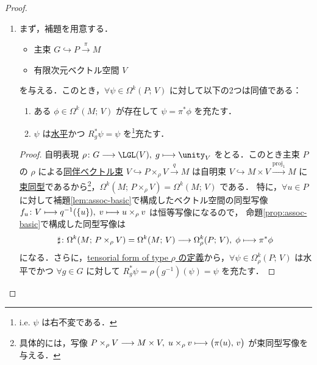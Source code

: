 \documentclass[TQFT_main]{subfiles}
\begin{document}
\begin{proof}
    \begin{enumerate}
        \item まず，補題を用意する．
        
        \hrulefill
        \begin{mylem}[label=lem:basic-form]{}
            \begin{itemize}
                \item 主束 $G \hookrightarrow P \xrightarrow{\pi} M$
                \item 有限次元ベクトル空間 $V$
            \end{itemize}
            を与える．このとき，$\forall \psi \in \Omega^k(P;\, V)$ に対して以下の2つは同値である：
            \begin{enumerate}
                \item ある $\phi \in \Omega^k (M;\, V)$ が存在して $\psi = \pi^* \phi$ を充たす．
                \item $\psi$ は\hyperref[def:tensorial-form]{水平}かつ $R_g^* \psi = \psi$ を\footnote{i.e. $\psi$ は右不変である．}充たす．
            \end{enumerate}
        \end{mylem}
        \begin{proof}
            自明表現 $\rho \colon G \lto \LGL(V),\; g \lmto \unity_V$ をとる．このとき主束 $P$ の $\rho$ による\hyperref[def:associated-vect]{同伴ベクトル束} $V \hookrightarrow P \times_\rho V \xrightarrow{q} M$ は自明束 $V \hookrightarrow M \times V \xrightarrow{\mathrm{proj}_1} M$ に\hyperref[def.bundlemap]{束同型}であるから\footnote{具体的には，写像 $P \times_\rho V \longrightarrow M \times V,\; u \times_\rho v \longmapsto \bigl( \pi(u),\, v \bigr)$ が束同型写像を与える．}，$\Omega^k (M;\, P \times_\rho V) = \Omega^k (M;\, V)$ である．
            特に，$\forall u \in P$ に対して補題\ref{lem:assoc-basic}で構成したベクトル空間の同型写像 $f_u \colon V \longmapsto q^{-1} (\{u\}),\; v \longmapsto u \times_\rho v$ は恒等写像になるので，
            命題\ref{prop:assoc-basic}で構成した同型写像は
            \begin{align}
                \sharp \colon \Omega^k (M;\, P \times_\rho V) = \Omega^k (M;\, V) \longrightarrow \Omega^k_\rho (P;\, V),\; \phi \longmapsto  \pi^* \phi
            \end{align}
            になる．さらに，\hyperref[def:tensorial-form]{tensorial form of type $\rho$ の定義}から，$\forall \psi \in \Omega^k_\rho (P;\, V)$ は水平でかつ $\forall g \in G$ に対して $R_g^* \psi = \rho(g^{-1})(\psi) = \psi$ を充たす．
        \end{proof}
        \hrulefill


\end{enumerate}
\end{proof}
\end{document}
